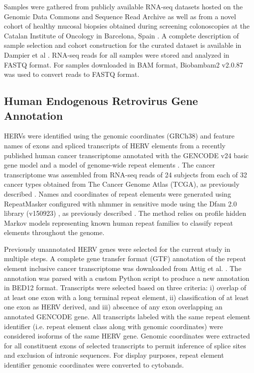 \documentclass[11pt,letterpaper]{article}
\begin{document}
Samples were gathered from publicly available RNA-seq datasets hosted on the Genomic Data Commons and Sequence Read Archive as well as from a novel cohort of healthy mucosal biopsies obtained during screening colonoscopies at the Catalan Institute of Oncology in Barcelona, Spain \citep{Dampier2020, DiezObrero2020}.
A complete description of sample selection and cohort construction for the curated dataset is available in Dampier et al \citep{Dampier2020}.
RNA-seq reads for all samples were stored and analyzed in FASTQ format.
For samples downloaded in BAM format, Biobambam2 v2.0.87 \citep{Tischler2014} was used to convert reads to FASTQ format.

\subsection*{Human Endogenous Retrovirus Gene Annotation}
HERVs were identified using the genomic coordinates (GRCh38) and feature names of exons and spliced transcripts of HERV elements from a recently published human cancer transcriptome annotated with the GENCODE v24 basic gene model \citep{Frankish2018} and a model of genome-wide repeat elements \citep{Attig2019}.
The cancer transcriptome was assembled from RNA-seq reads of 24 subjects from each of 32 cancer types obtained from The Cancer Genome Atlas (TCGA), as previously described \citep{Attig2019}.
Names and coordinates of repeat elements were generated using RepeatMasker \citep{Smit2015} configured with nhmmer \citep{Wheeler2013} in sensitive mode using the Dfam 2.0 library (v150923) \citep{Hubley2015}, as previously described \citep{Attig2017}.
The method relies on profile hidden Markov models representing known human repeat families to classify repeat elements throughout the genome.

Previously unannotated HERV genes were selected for the current study in multiple steps.
A complete gene transfer format (GTF) \citep{GTF} annotation of the repeat element inclusive cancer transcriptome was downloaded from Attig et al. \citep{Attig2019}.
The annotation was parsed with a custom Python script to produce a new annotation in BED12 \citep{BED12} format.
Transcripts were selected based on three criteria: i) overlap of at least one exon with a long terminal repeat element, ii) classification of at least one exon as HERV derived, and iii) abscence of any exon overlapping an annotated GENCODE gene.
All transcripts labeled with the same repeat element identifier (i.e. repeat element class along with genomic coordinates) were considered isoforms of the same HERV gene.
Genomic coordinates were extracted for all constituent exons of selected transcripts to permit inference of splice sites and exclusion of intronic sequences.
For display purposes, repeat element identifier genomic coordinates were converted to cytobands.
\end{document}
